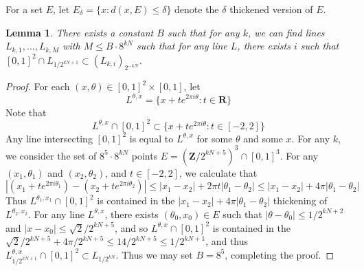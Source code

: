 \documentclass[dvipsnames,letterpaper,12pt]{article}
\numberwithin{equation}{section}
\theoremstyle{plain}
\newtheorem{lemma}{Lemma}
\theoremstyle{remark}
\begin{document}
For a set $E$, let $E_\delta = \{ x: d(x,E) \leq \delta \}$ denote the $\delta$ thickened version of $E$.

\begin{lemma} \label{lineCounting}
	There exists a constant $B$ such that for any $k$, we can find lines $L_{k,1}, \dots, L_{k,M}$ with $M \leq B \cdot 8^{kN}$ such that for any line $L$, there exists $i$ such that $[0,1]^2 \cap L_{1/2^{kN+1}} \subset (L_{k,i})_{2^{-kN}}$.
\end{lemma}
\begin{proof}
	For each $(x,\theta) \in [0,1]^2 \times [0,1]$, let
	\[ L^{\theta,x} = \{ x + t e^{2 \pi i \theta} : t \in \mathbf{R} \} \]
	Note that
	\[ L^{\theta,x} \cap [0,1]^2 \subset \{ x + t e^{2 \pi i \theta} : t \in [-2,2] \} \]
	Any line intersecting $[0,1]^2$ is equal to $L^{\theta,x}$ for some $\theta$ and some $x$. For any $k$, we consider the set of $8^5 \cdot 8^{kN}$ points $E = (\mathbf{Z}/2^{kN+5})^3 \cap [0,1]^3$. For any $(x_1,\theta_1)$ and $(x_2,\theta_2)$, and $t \in [-2,2]$, we calculate that
	\[ |(x_1 + t e^{2 \pi i \theta_1}) - (x_2 + te^{2 \pi i \theta_2})| \leq |x_1 - x_2| + 2 \pi t |\theta_1 - \theta_2| \leq |x_1 - x_2| + 4 \pi |\theta_1 - \theta_2| \]
	Thus $L^{\theta_1,x_1} \cap [0,1]^2$ is contained in the $|x_1 - x_2| + 4 \pi |\theta_1 - \theta_2|$ thickening of $L^{\theta_2,x_2}$. For any line $L^{\theta,x}$, there exists $(\theta_0,x_0) \in E$ such that $|\theta - \theta_0| \leq 1/2^{kN+2}$ and $|x - x_0| \leq \sqrt{2}/2^{kN+5}$, and so $L^{\theta,x} \cap [0,1]^2$ is contained in the $\sqrt{2}/2^{kN+5} + 4\pi/2^{kN+5} \leq 14/2^{kN+5} \leq 1/2^{kN+1}$, and thus $L^{\theta,x}_{1/2^{kN+1}} \cap [0,1]^2 \subset L_{1/2^{kN}}$. Thus we may set $B = 8^5$, completing the proof.
\end{proof}
\end{document}
